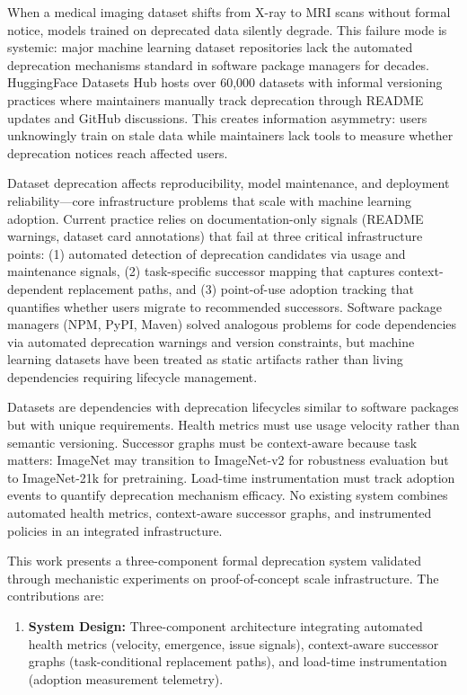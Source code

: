 
When a medical imaging dataset shifts from X-ray to MRI scans without formal notice, models trained on deprecated data silently degrade. This failure mode is systemic: major machine learning dataset repositories lack the automated deprecation mechanisms standard in software package managers for decades. HuggingFace Datasets Hub hosts over 60,000 datasets with informal versioning practices where maintainers manually track deprecation through README updates and GitHub discussions. This creates information asymmetry: users unknowingly train on stale data while maintainers lack tools to measure whether deprecation notices reach affected users.

Dataset deprecation affects reproducibility, model maintenance, and deployment reliability---core infrastructure problems that scale with machine learning adoption. Current practice relies on documentation-only signals (README warnings, dataset card annotations) that fail at three critical infrastructure points: (1) automated detection of deprecation candidates via usage and maintenance signals, (2) task-specific successor mapping that captures context-dependent replacement paths, and (3) point-of-use adoption tracking that quantifies whether users migrate to recommended successors. Software package managers (NPM, PyPI, Maven) solved analogous problems for code dependencies via automated deprecation warnings and version constraints, but machine learning datasets have been treated as static artifacts rather than living dependencies requiring lifecycle management.

Datasets are dependencies with deprecation lifecycles similar to software packages but with unique requirements. Health metrics must use usage velocity rather than semantic versioning. Successor graphs must be context-aware because task matters: ImageNet may transition to ImageNet-v2 for robustness evaluation but to ImageNet-21k for pretraining. Load-time instrumentation must track adoption events to quantify deprecation mechanism efficacy. No existing system combines automated health metrics, context-aware successor graphs, and instrumented policies in an integrated infrastructure.

This work presents a three-component formal deprecation system validated through mechanistic experiments on proof-of-concept scale infrastructure. The contributions are:

\begin{enumerate}
\item \textbf{System Design:} Three-component architecture integrating automated health metrics (velocity, emergence, issue signals), context-aware successor graphs (task-conditional replacement paths), and load-time instrumentation (adoption measurement telemetry).
\end{enumerate}

